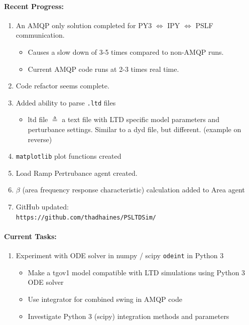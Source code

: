 \documentclass[12pt]{article}
\begin{document}
\begin{multicols}{2}

	\paragraph{Recent Progress:}
	\begin{enumerate}
		\item An AMQP only solution completed for PY3 $\Leftrightarrow $ IPY $\Leftrightarrow $ PSLF communication.
			\begin{itemize}
			\item Causes a slow down of 3-5 times compared to non-AMQP runs.
			\item Current AMQP code runs at 2-3 times real time.
			\end{itemize}

		\item Code refactor seems complete.

		\item Added ability to parse \verb|.ltd| files
			\begin{itemize}
			\item ltd file $\triangleq$ a text file with LTD specific model parameters and perturbance settings. Similar to a dyd file, but different. (example on reverse)
			\end{itemize}

		\item \verb|matplotlib| plot functions created

		\item Load Ramp Pertrubance agent created.

		\item $\beta$ (area frequency response characteristic) calculation added to Area agent

		\item GitHub updated:\\
		\verb|https://github.com/thadhaines/PSLTDSim/|
		
	\end{enumerate}
\paragraph{Current Tasks:}
	\begin{enumerate}
	
		\item Experiment with ODE solver in numpy / scipy \verb|odeint| in Python 3
			\begin{itemize}
			\item Make a tgov1 model compatible with LTD simulations using Python 3 ODE solver
			\item Use integrator for combined swing in AMQP code
			\item Investigate Python 3 (scipy) integration methods and parameters
			\end{itemize}


\end{enumerate}
\end{multicols}
\end{document}
